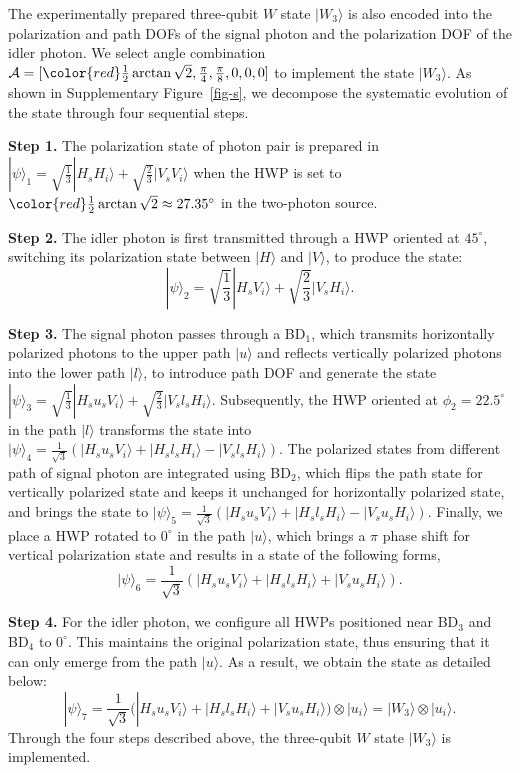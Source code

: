 \documentclass[prl,aps,notitlepage,superscriptaddress,showpacs,nofootinbib]{revtex4-2}
\newcommand{\red}[1]{{\color{red} #1}}
\begin{document}
The experimentally prepared three-qubit $W$ state $|W_3\rangle$ is also encoded into the polarization and path DOFs of the signal photon and the polarization DOF of the idler photon. We select angle combination $\mathcal{A}=[\red{\frac{1}{2}\arctan{\sqrt{2}}},\frac{\pi}{4},\frac{\pi}{8},0,0,0]$ to implement the state $|W_3\rangle$. As shown in \red{Supplementary}  Figure~\ref{fig-s}, we decompose the systematic evolution of the state through four sequential steps.

\textbf{Step 1.} The polarization state of photon pair is prepared in   $|\psi\rangle_1=\sqrt{\frac{1}{3}}|H_sH_i\rangle+\sqrt{\frac{2}{3}}|V_sV_i\rangle$ when the HWP is set to $\red{\frac{1}{2}\arctan{\sqrt{2}}\approx 27.35^\circ}$ in the two-photon source. 

\textbf{Step 2.} The idler photon is first transmitted through a HWP oriented at $45^\circ$, switching its polarization state between $|H\rangle$ and $|V\rangle$, to produce the state:
\begin{equation}
|\psi\rangle_2=\sqrt{\frac{1}{3}}|H_sV_i\rangle+\sqrt{\frac{2}{3}}|V_sH_i\rangle.
\end{equation}

\textbf{Step 3.} The signal photon passes through a BD$_1$, which transmits horizontally polarized photons to the upper path $|u\rangle$ and reflects vertically polarized photons into the lower path $|l\rangle$, to introduce path DOF and generate the state  $|\psi\rangle_3=\sqrt{\frac{1}{3}}|H_su_sV_i\rangle+\sqrt{\frac{2}{3}}|V_sl_sH_i\rangle$. 
Subsequently, the HWP oriented at $\phi_2=22.5^\circ$ in the path $|l\rangle$ transforms the state into $|\psi\rangle_4=\frac{1}{\sqrt{3}}(|H_su_sV_i\rangle+|H_sl_sH_i\rangle-|V_sl_sH_i\rangle)$. The polarized states from different path of signal photon are integrated using BD$_2$, which flips the path state for vertically polarized  state and keeps it unchanged for horizontally polarized state, and brings the state to $|\psi\rangle_5=\frac{1}{\sqrt{3}}(|H_su_sV_i\rangle+|H_sl_sH_i\rangle-|V_su_sH_i\rangle)$. Finally, we place a HWP rotated to $0^\circ$ in the path $|u\rangle$, which brings a $\pi$ phase shift for vertical polarization state and results in a state of the following forms,
\begin{equation}
	|\psi\rangle_6=\frac{1}{\sqrt{3}}(|H_su_sV_i\rangle+|H_sl_sH_i\rangle+|V_su_sH_i\rangle).
\end{equation}

\textbf{Step 4.} For the idler photon, we configure all HWPs positioned near BD$_3$ and BD$_4$ to $0^\circ$.  This maintains the original polarization state, thus ensuring that it can only emerge from the path $|u\rangle$. As a result, we obtain the state as detailed below:
\begin{equation}
	|\psi\rangle_7=\frac{1}{\sqrt{3}}(|H_su_sV_i\rangle+|H_sl_sH_i\rangle+|V_su_sH_i\rangle)\otimes|u_i\rangle=|W_3\rangle\otimes|u_i\rangle.
\end{equation}
Through the four steps described above, the three-qubit $W$ state $|W_3\rangle$ is implemented.
\end{document}
